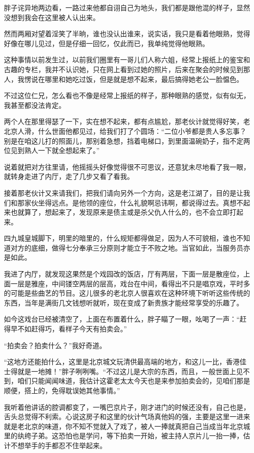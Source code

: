 胖子诧异地两边看，一路过来他都自诩自己为地头，我们都是跟他混的样子，显然没想到我会在这里被人认出来。

然而两厢对望着淫笑了半晌，谁也没认出谁来，说实话，我只是看着他眼熟，觉得好像在哪儿见过，但是仔细一回忆，仅此而已，我单纯觉得他眼熟。

这种事情以前发生过，以前我们圈里有一哥儿们人称六姐，经常上报纸上的鉴宝和古趣的专栏，我并不认识她，只在网上看到过她的照片，后来在聚会的时候见到那人，我愣说在哪里和她吃过饭，但是就是想不起来，最后搞得她老公一脸愠色。

不过这位仁兄，怎么看也不像是经常上报纸的样子，那种眼熟的感觉，似有似无，我甚至都没法肯定。

两个人在那里得瑟了一下，实在想不起来，都有点尴尬，那老伙计就觉得好笑，老北京人滑，什么世面他都见过，给我们打了个圆场：“二位小爷都是贵人多忘事？别是在咱这儿打的照面儿，那别着急想，挡着电梯口，到里面温碗奶子，指不定两位见到熟人一下就全想起来了。”

说着就把对方往里请，他摇摇头好像觉得很不可思议，还意犹未尽地看了我一眼，就转身走进了内厅，走了几步又看了看我。

接着那老伙计又来请我们，把我们请向另外一个方向，这是老江湖了，目的是让我们和那家伙坐得远点。是他领的座位，什么礼貌啊忌讳啊，都说得过去。真想不起来也就算了，想起来了，发现原来是债主或是杀父仇人什么的，也不会立即打起来。

四九城皇城脚下，明里的暗里的，什么规矩都得做足，因为人不可貌相，谁也不知道对方的底细，做得七分奉承三分原则才能立于不败之地。当官如此，当服务员亦是如此。

我进了内厅，就发现这果然是个戏园改的饭店，厅有两层，下面一层是散座位，上面一层是雅座，中间镂空两层的层高，戏台在中间，看得出不只是唱京戏，平时多的可能是些曲艺的节目。这儿很多的老北京人很喜欢在这种环境下听听这些传统的东西，当年是满街几文钱想听就听，现在变成了新贵族才能经常享受的乐趣了。

如今这戏台已经被清空了，上面在布置着什么，胖子瞄了一眼，吆喝了一声：“赶得早不如赶得巧，看样子今天有拍卖会。”

“拍卖会？拍卖什么？”我好奇道。

“这地方还能拍什么，这里是北京城文玩清供最高端的地方，和这儿一比，香港佳士得就是一地摊！”胖子咧咧嘴。“不过这儿是大宗的东西，而且，一般世面上见不到，咱们只能闻闻味道，我估计这霍老太太今天也是来参加拍卖会的，见咱们那是顺便，搭上的，免得耽误她其他事情。”

我听着他讲话的腔调都变了，一嘴巴京片子，刚才进门的时候还没有，自己也是，舌头总觉得不利索。心说这房子和这里的伙计气场真他妈的强，主要是这里一进来就是老北京的味道，你不知不觉就入了戏了，被人一捧就真把自己当成当年北京城里的纨绔子弟。这恐怕也是学问，等下拍卖一开始，被主持人京片儿一抬一捧，估计不想举手的手都忍不住举起来。

